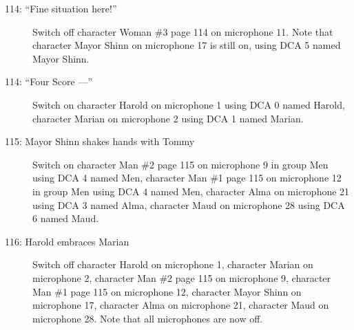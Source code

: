 \begin{description}
\item[114: ``Fine situation here!'']
Switch off character Woman \#3 page 114 on microphone 11. Note that character Mayor Shinn on microphone 17 is still on, using DCA 5 named Mayor Shinn.

\item[114: ``Four Score ---'']
Switch on character Harold on microphone 1 using DCA 0 named Harold, character Marian on microphone 2 using DCA 1 named Marian. 

\item[115: Mayor Shinn shakes hands with Tommy]
Switch on character Man \#2 page 115 on microphone 9 in group Men using DCA 4 named Men, character Man \#1 page 115 on microphone 12 in group Men using DCA 4 named Men, character Alma on microphone 21 using DCA 3 named Alma, character Maud on microphone 28 using DCA 6 named Maud. 

\item[116: Harold embraces Marian]
Switch off character Harold on microphone 1, character Marian on microphone 2, character Man \#2 page 115 on microphone 9, character Man \#1 page 115 on microphone 12, character Mayor Shinn on microphone 17, character Alma on microphone 21, character Maud on microphone 28. Note that all microphones are now off.

\end{description}
